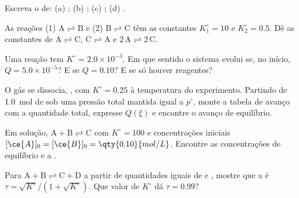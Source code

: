 \begin{exercise}[$\star$]\label{exo:b1:extent-q-and-k:4}
Escreva o  de: (a) ;
(b) ; (c) ; (d) .
\end{exercise}

\begin{exercise}[$\star\star$]\label{exo:b1:extent-q-and-k:5}
As reações (1) $\mathrm{A \rightleftharpoons B}$ e (2) $\mathrm{B \rightleftharpoons C}$ têm as constantes
$K_1^\circ = 10$ e $K_2^\circ = 0.5$. Dê as constantes de $\mathrm{A \rightleftharpoons C}$,
$\mathrm{C \rightleftharpoons A}$ e $\mathrm{2\,A \rightleftharpoons 2\,C}$.
\end{exercise}

\begin{exercise}[$\star\star$]\label{exo:b1:extent-q-and-k:6}
Uma reação tem $K^\circ = 2.0 \times 10^{-3}$. Em que sentido o sistema
evolui se, no início, $Q = 5.0 \times 10^{-5}$? E se $Q = 0.10$?
E se só houver reagentes?
\end{exercise}

\begin{exercise}[$\star\star$]\label{exo:b1:extent-q-and-k:7}
O gás  se dissocia, , com $K^\circ = 0.25$ à
temperatura do experimento. Partindo de \qty{1.0}{mol} de  sob
uma pressão total mantida igual a $p^\circ$, monte a tabela de avanço
com a quantidade total, expresse $Q(\xi)$ e encontre o avanço de
equilíbrio.
\end{exercise}

\begin{exercise}[$\star\star$]\label{exo:b1:extent-q-and-k:8}
Em solução, $\mathrm{A + B \rightleftharpoons C}$ com $K^\circ = 100$ e concentrações
iniciais $[\ce{A}]_0 = [\ce{B}]_0 = \qty{0.10}{mol/L}$. Encontre as
concentrações de equilíbrio e a .
\end{exercise}

\begin{exercise}[$\star\star$]\label{exo:b1:extent-q-and-k:9}
Para $\mathrm{A + B \rightleftharpoons C + D}$ a partir de quantidades iguais de  e , mostre que
a  é $\tau = \sqrt{K^\circ}/(1 + \sqrt{K^\circ})$.
Que valor de $K^\circ$ dá $\tau = 0.99$?
\end{exercise}

